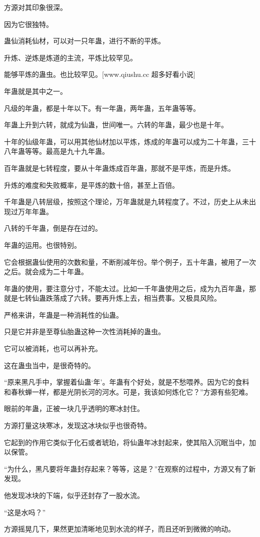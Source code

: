 \begin{this_body}
方源对其印象很深。

因为它很独特。

蛊仙消耗仙材，可以对一只年蛊，进行不断的平炼。

升炼、逆炼是炼道的主流，平炼比较罕见。

能够平炼的蛊虫。也比较罕见。[www.qiushu.cc 超多好看小说]

年蛊就是其中之一。

凡级的年蛊，都是十年以下。有一年蛊，两年蛊，五年蛊等等。

年蛊上升到六转，就成为仙蛊，世间唯一。六转的年蛊，最少也是十年。

十年的仙级年蛊，可以用其他仙材加以平炼，炼成的年蛊可以成为二十年蛊，三十八年蛊等等。最高是九十九年蛊。

百年蛊就是七转程度，要从十年蛊炼成百年蛊，那就不是平炼，而是升炼。

升炼的难度和失败概率，是平炼的数十倍，甚至上百倍。

千年蛊是八转层级，按照这个理论，万年蛊就是九转程度了。不过，历史上从未出现过万年年蛊。

八转的千年蛊，倒是存在过的。

年蛊的运用。也很特别。

它会根据蛊仙使用的次数和量，不断削减年份。举个例子，五十年蛊，被用了一次之后。就会成为二十年蛊。

年蛊的使用，要注意分寸，不能太过。比如一千年蛊使用之后，成为九百年蛊，那就是七转仙蛊跌落成了六转。要再升炼上去，相当费事。又极具风险。

严格来讲，年蛊是一种消耗性的仙蛊。

只是它并非是至尊仙胎蛊这种一次性消耗掉的蛊虫。

它可以被消耗，也可以再补充。

这在蛊虫当中，是很奇特的。

“原来黑凡手中，掌握着仙蛊‘年’。年蛊有个好处，就是不愁喂养。因为它的食料和春秋蝉一样，都是光阴长河的河水。可是，我该如何炼化它？”方源有些犯难。

眼前的年蛊，正被一块几乎透明的寒冰封住。

方源打量这块寒冰，发现这冰块似乎也很奇特。

它起到的作用它类似于化石或者琥珀，将仙蛊年冰封起来，使其陷入沉眠当中，加以保管。

“为什么，黑凡要将年蛊封存起来？等等，这是？”在观察的过程中，方源又有了新发现。

他发现冰块的下端，似乎还封存了一股水流。

“这是水吗？”

方源摇晃几下，果然更加清晰地见到水流的样子，而且还听到微微的响动。


\end{this_body}
